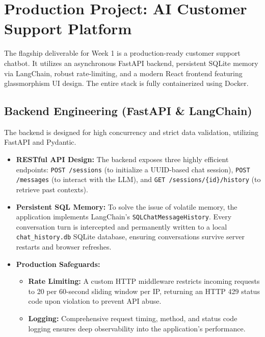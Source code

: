 \documentclass[12pt, a4paper]{article}
\begin{document}
\section{Production Project: AI Customer Support Platform}

\begin{tcolorbox}[colback=accent, colframe=primary, title=\textbf{Architectural Overview}, boxrule=1pt]
The flagship deliverable for Week 1 is a production-ready customer support chatbot. It utilizes an asynchronous FastAPI backend, persistent SQLite memory via LangChain, robust rate-limiting, and a modern React frontend featuring glassmorphism UI design. The entire stack is fully containerized using Docker.
\end{tcolorbox}

\subsection{Backend Engineering (FastAPI \& LangChain)}
The backend is designed for high concurrency and strict data validation, utilizing FastAPI and Pydantic. 
\begin{itemize}[label=\textcolor{secondary}{$\bullet$}]
    \item \textbf{RESTful API Design:} The backend exposes three highly efficient endpoints: \texttt{POST /sessions} (to initialize a UUID-based chat session), \texttt{POST /messages} (to interact with the LLM), and \texttt{GET /sessions/\{id\}/history} (to retrieve past contexts).
    \item \textbf{Persistent SQL Memory:} To solve the issue of volatile memory, the application implements LangChain's \texttt{SQLChatMessageHistory}. Every conversation turn is intercepted and permanently written to a local \texttt{chat\_history.db} SQLite database, ensuring conversations survive server restarts and browser refreshes.
    \item \textbf{Production Safeguards:} 
    \begin{itemize}
        \item \textbf{Rate Limiting:} A custom HTTP middleware restricts incoming requests to 20 per 60-second sliding window per IP, returning an HTTP 429 status code upon violation to prevent API abuse.
        \item \textbf{Logging:} Comprehensive request timing, method, and status code logging ensures deep observability into the application's performance.
    \end{itemize}
\end{itemize}
\end{document}
